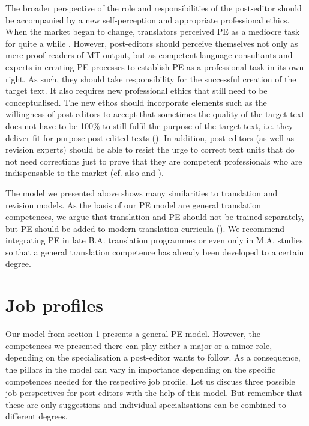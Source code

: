 \hspace*{-3pt}The broader perspective of the role and responsibilities of the post-editor should be accompanied by a new self-perception and appropriate professional ethics. When the market began to change, translators perceived PE as a mediocre task for quite a while \citep{guerberof2013professional}. However, post-editors should perceive themselves not only as mere proof-readers of MT output, but as competent language consultants and experts in creating PE processes to establish PE as a professional task in its own right. As such, they should take responsibility for the successful creation of the target text. It also requires new professional ethics that still need to be conceptualised. The new ethos should incorporate elements such as the willingness of post-editors to accept that sometimes the quality of the target text does not have to be 100\% to still fulfil the purpose of the target text, i.e. they deliver fit-for-purpose post-edited texts (\citealt{bowker2019}). In addition, post-editors (as well as revision experts) should be able to resist the urge to correct text units that do not need corrections just to prove that they are competent professionals who are indispensable to the market (cf. also \citealt{mossop2019revising} and \citealt{vardaro2019translation}).

The model we presented above shows many similarities to translation and revision models. As the basis of our PE model are general translation competences, we argue that translation and PE should not be trained separately, but PE should be added to modern translation curricula (\citealt{bernardini2020}). We recommend integrating PE in late B.A. translation programmes or even only in M.A. studies so that a general translation competence has already been developed to a certain degree. 

\section{Job profiles}\label{sec:9:2}

Our model from section \ref{sec:9:2} presents a general PE model. However, the competences we presented there can play either a major or a minor role, depending on the specialisation a post-editor wants to follow. As a consequence, the pillars in the model can vary in importance depending on the specific competences needed for the respective job profile. Let us discuss three possible job perspectives for post-editors with the help of this model. But remember that these are only suggestions and individual specialisations can be combined to different degrees.

